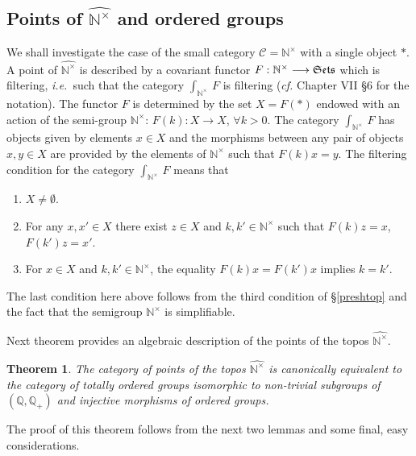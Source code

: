 \documentclass[noams,lp]{compositio}
\newtheorem{thm}{Theorem}[section] %
\def\N{{\mathbb N}}
\def\Q{{\mathbb Q}}
\def\cC{{\mathcal C}}
\newcommand{\ie}{{\it i.e.\/}\ }
\newcommand{\cf}{{\it cf.}}
\def\Se{\frak{ Sets}}
\def\nt{\N^{\times}}
\def\wnt{{\widehat{\N^{\times}}}}
\begin{document}
\subsection{Points of $\wnt$ and ordered groups}\label{ptstogr}
We shall investigate the case of the small category $\cC = \N^\times$ with a single object $\ast$. A point of $\wnt$ is described by a covariant functor $F: \N^\times\longrightarrow \Se$ which is filtering, \ie such that the category $\int_{\N^\times}\, F$ is filtering (\cf \cite{MM} Chapter VII \S 6 for the notation). The functor $F$ is determined by the set $X=F(*)$ endowed with an action of the semi-group $\N^\times$: $F(k):X\to X$, $\forall k>0$. The category $\int_{\N^\times}\, F$ has objects given by elements $x\in X$ and the morphisms between any pair of objects $x,y\in X$ are provided by the elements of $\nt$ such that $F(k)x=y$. The filtering condition for the category $\int_{\N^\times}\, F$  means that
\begin{enumerate}
\item $X\neq \emptyset$.
\item For any $x,x'\in X$ there exist $z\in X$ and $k,k'\in \N^\times$ such that $F(k)z=x$, $F(k')z=x'$.
\item For $x\in X$ and $k,k'\in \N^\times$, the equality $F(k)x=F(k')x$ implies $k=k'$.
\end{enumerate}
The last condition here above follows from the third condition of \S \ref{preshtop} and the fact that the semigroup $\nt$ is simplifiable.

Next theorem provides an algebraic description of the points of the topos $\widehat{ \N^\times} $.

\begin{thm}\label{thmstart}
The category of points of the topos $\widehat{ \N^\times} $ is canonically equivalent to the category of totally ordered groups isomorphic to non-trivial subgroups of   $(\Q,\Q_+)$ and injective morphisms of ordered groups.
\end{thm}
\proof The proof of this theorem follows from the next two lemmas and some final, easy considerations.
\end{document}
